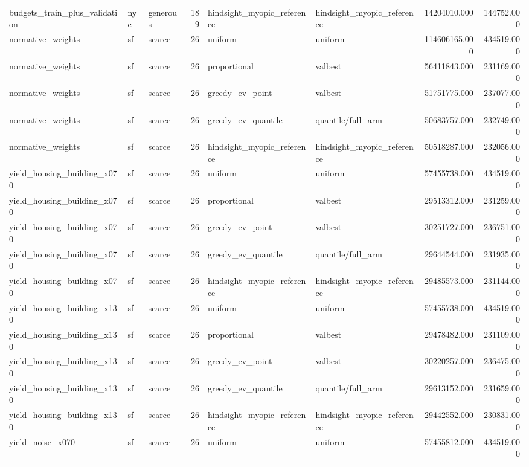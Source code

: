 \begin{tabular}{lllrllrr}
budgets\_train\_plus\_validation & nyc & generous & 189 & hindsight\_myopic\_reference & hindsight\_myopic\_reference & 14204010.000 & 144752.000 \\
normative\_weights & sf & scarce & 26 & uniform & uniform & 114606165.000 & 434519.000 \\
normative\_weights & sf & scarce & 26 & proportional & valbest & 56411843.000 & 231169.000 \\
normative\_weights & sf & scarce & 26 & greedy\_ev\_point & valbest & 51751775.000 & 237077.000 \\
normative\_weights & sf & scarce & 26 & greedy\_ev\_quantile & quantile/full\_arm & 50683757.000 & 232749.000 \\
normative\_weights & sf & scarce & 26 & hindsight\_myopic\_reference & hindsight\_myopic\_reference & 50518287.000 & 232056.000 \\
yield\_housing\_building\_x070 & sf & scarce & 26 & uniform & uniform & 57455738.000 & 434519.000 \\
yield\_housing\_building\_x070 & sf & scarce & 26 & proportional & valbest & 29513312.000 & 231259.000 \\
yield\_housing\_building\_x070 & sf & scarce & 26 & greedy\_ev\_point & valbest & 30251727.000 & 236751.000 \\
yield\_housing\_building\_x070 & sf & scarce & 26 & greedy\_ev\_quantile & quantile/full\_arm & 29644544.000 & 231935.000 \\
yield\_housing\_building\_x070 & sf & scarce & 26 & hindsight\_myopic\_reference & hindsight\_myopic\_reference & 29485573.000 & 231144.000 \\
yield\_housing\_building\_x130 & sf & scarce & 26 & uniform & uniform & 57455738.000 & 434519.000 \\
yield\_housing\_building\_x130 & sf & scarce & 26 & proportional & valbest & 29478482.000 & 231109.000 \\
yield\_housing\_building\_x130 & sf & scarce & 26 & greedy\_ev\_point & valbest & 30220257.000 & 236475.000 \\
yield\_housing\_building\_x130 & sf & scarce & 26 & greedy\_ev\_quantile & quantile/full\_arm & 29613152.000 & 231659.000 \\
yield\_housing\_building\_x130 & sf & scarce & 26 & hindsight\_myopic\_reference & hindsight\_myopic\_reference & 29442552.000 & 230831.000 \\
yield\_noise\_x070 & sf & scarce & 26 & uniform & uniform & 57455812.000 & 434519.000 \\

\end{tabular}
